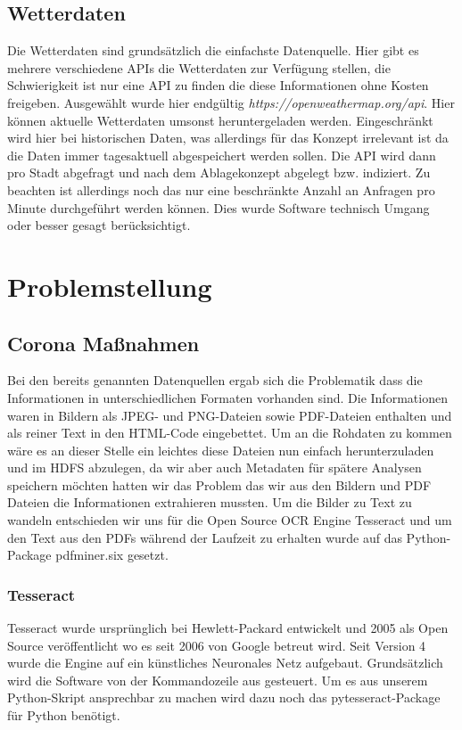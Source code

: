 \documentclass[12pt,oneside,a4paper,parskip]{scrbook}
\begin{document}
\section{Wetterdaten}
Die Wetterdaten sind grunds\"atzlich die einfachste Datenquelle. Hier gibt es mehrere verschiedene APIs die Wetterdaten zur Verfügung stellen, die Schwierigkeit ist nur eine API zu finden die diese Informationen ohne Kosten freigeben.
Ausgew\"ahlt wurde hier endg\"ultig \textit{https://openweathermap.org/api}. Hier k\"onnen aktuelle Wetterdaten umsonst heruntergeladen werden. Eingeschr\"ankt wird hier bei historischen Daten, was allerdings f\"ur das Konzept irrelevant ist da die Daten immer tagesaktuell abgespeichert werden sollen. \newline
Die API wird dann pro Stadt abgefragt und nach dem Ablagekonzept abgelegt bzw. indiziert. Zu beachten ist allerdings noch das nur eine beschr\"ankte Anzahl an Anfragen pro Minute durchgef\"uhrt werden k\"onnen. Dies wurde Software technisch Umgang oder besser gesagt ber\"ucksichtigt.

\chapter{Problemstellung}
\section{Corona Maßnahmen}
Bei den bereits genannten Datenquellen ergab sich die Problematik dass die Informationen in unterschiedlichen Formaten vorhanden sind. Die Informationen waren in Bildern als JPEG- und PNG-Dateien sowie PDF-Dateien enthalten und als reiner Text in den HTML-Code eingebettet. Um an die Rohdaten zu kommen wäre es an dieser Stelle ein leichtes diese Dateien nun einfach herunterzuladen und im HDFS abzulegen, da wir aber auch Metadaten für spätere Analysen speichern möchten hatten wir das Problem das wir aus den Bildern und PDF Dateien die Informationen extrahieren mussten. Um die Bilder zu Text zu wandeln entschieden wir uns für die Open Source OCR Engine Tesseract und um den Text aus den PDFs während der Laufzeit zu erhalten wurde auf das Python-Package pdfminer.six gesetzt.

\subsection{Tesseract}
Tesseract wurde ursprünglich bei Hewlett-Packard entwickelt und 2005 als Open Source veröffentlicht wo es seit 2006 von Google betreut wird.
Seit Version 4 wurde die Engine auf ein künstliches Neuronales Netz aufgebaut. Grundsätzlich wird die Software von der Kommandozeile aus gesteuert. Um es aus unserem Python-Skript ansprechbar zu machen wird dazu noch das pytesseract-Package für Python benötigt.
\end{document}

